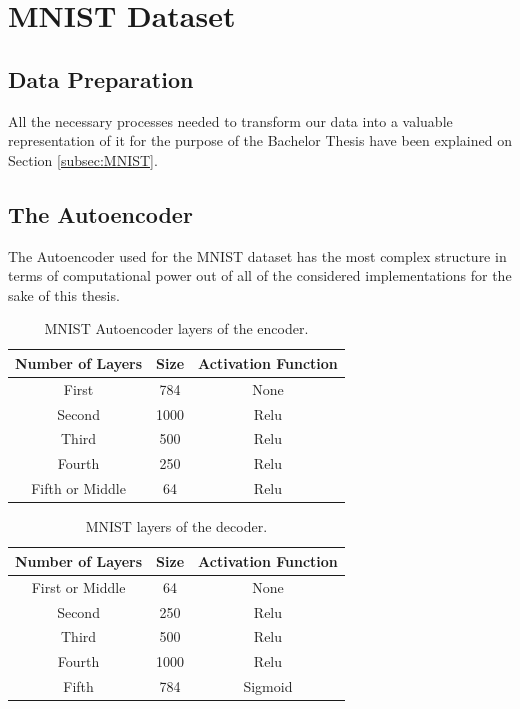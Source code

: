 
\section{MNIST Dataset}
\subsection{Data Preparation}

All the necessary processes needed to transform our data into a valuable representation of it for the purpose of the Bachelor Thesis have been explained on Section \ref{subsec:MNIST}.

\subsection{The Autoencoder}
The Autoencoder used for the MNIST dataset has the most complex structure in terms of computational power out of all of the considered implementations for the sake of this thesis. 

\begin{table}[H]
	\caption{MNIST Autoencoder layers of the encoder.}
	\begin{center}
		\label{tab:table_MNIST_auto_encoder}
		\begin{tabular}{c|c|c} %
			\textbf{Number of Layers} & \textbf{Size} & \textbf{Activation Function} \\
			\hline
			First & 784 & None\\
			Second & 1000 & Relu\\
			Third & 500  & Relu\\
			Fourth & 250 & Relu\\
			Fifth or Middle & 64 & Relu\\
		\end{tabular}
	\end{center}
\end{table}

\begin{table}[H]
	\caption{MNIST layers of the decoder.}
	\begin{center}
		\label{tab:table_MNIST_auto_decoder}
		\begin{tabular}{c|c|c} %
			\textbf{Number of Layers} & \textbf{Size} & \textbf{Activation Function} \\
			\hline
			First or Middle & 64 & None\\
			Second & 250 & Relu\\
			Third & 500  & Relu\\
			Fourth & 1000 & Relu\\
			Fifth & 784 & Sigmoid \\
		\end{tabular}
	\end{center}
\end{table}


